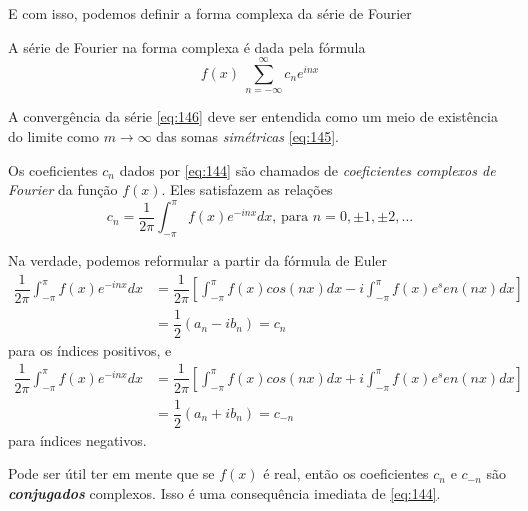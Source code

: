 E com isso, podemos definir a forma complexa da série de Fourier

\begin{definicao}
    A série de Fourier na forma complexa é dada pela fórmula 
    \begin{equation}
        \label{eq:146}
        f(x) ~ \sum\limits_{n=-\infty}^{\infty}c_n e^{inx}
    \end{equation}
\end{definicao}

A convergência da série \ref{eq:146} deve ser entendida como um meio de existência 
do limite como $m \rightarrow \infty$ das somas \textit{simétricas} \ref{eq:145}.

Os coeficientes $c_n$ dados por \ref{eq:144} são chamados de \textit{coeficientes
complexos de Fourier} da função $f(x)$. Eles satisfazem as relações 
\begin{equation}
\label{eq:147}
    c_n = \dfrac{1}{2\pi}\int_{-\pi}^{\pi}f(x)e^{-inx}dx\text{, para }n = 0, \pm 1, \pm 2, \ldots
\end{equation} 

Na verdade, podemos reformular a partir da fórmula de Euler
\begin{equation}
    \begin{split}
        \dfrac{1}{2\pi}\int_{-\pi}^{\pi}f(x)e^{-inx}dx &= \dfrac{1}{2\pi}\left[\int_{-\pi}^{\pi}f(x)cos(nx)dx - i\int_{-\pi}^{\pi}f(x)e^sen(nx)dx\right]\\
        &= \dfrac{1}{2}(a_n - ib_n) = c_n
    \end{split}
\end{equation}
para os índices positivos, e 
\begin{equation}
    \begin{split}
        \dfrac{1}{2\pi}\int_{-\pi}^{\pi}f(x)e^{-inx}dx &= \dfrac{1}{2\pi}\left[\int_{-\pi}^{\pi}f(x)cos(nx)dx + i\int_{-\pi}^{\pi}f(x)e^sen(nx)dx\right]\\
        &= \dfrac{1}{2}(a_n + ib_n) = c_{-n}
    \end{split}
\end{equation}
para índices negativos.

Pode ser útil ter em mente que se $f(x)$ é real, então os coeficientes $c_n$ e $c_{-n}$ são 
\textit{\textbf{conjugados}} complexos. Isso é uma consequência imediata de \ref{eq:144}.

